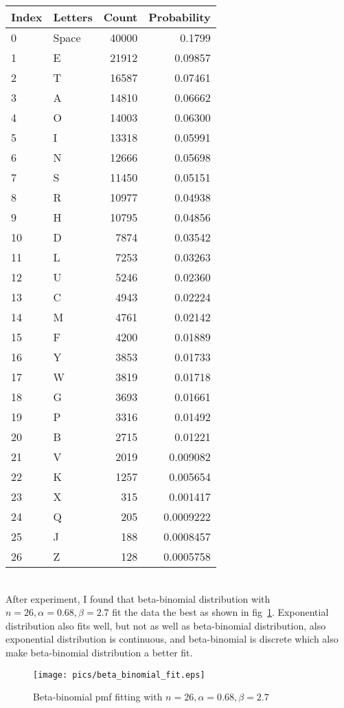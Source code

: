 \documentclass{assignment}
\begin{document}
\begin{enumerate}
\begin{enumerate}
    \begin{tabular}[h]{l|l|r|r}
      Index & Letters & Count & Probability\\
      \hline
      0     & Space   & 40000 & 0.1799\\
      1     & E       & 21912 & 0.09857\\
      2     & T       & 16587 & 0.07461\\
      3     & A       & 14810 & 0.06662\\
      4     & O       & 14003 & 0.06300\\
      5     & I       & 13318 & 0.05991\\
      6     & N       & 12666 & 0.05698\\
      7     & S       & 11450 & 0.05151\\
      8     & R       & 10977 & 0.04938\\
      9     & H       & 10795 & 0.04856\\
      10    & D       & 7874  & 0.03542\\
      11    & L       & 7253  & 0.03263\\
      12    & U       & 5246  & 0.02360\\
      13    & C       & 4943  & 0.02224\\
      14    & M       & 4761  & 0.02142\\
      15    & F       & 4200  & 0.01889\\
      16    & Y       & 3853  & 0.01733\\
      17    & W       & 3819  & 0.01718\\
      18    & G       & 3693  & 0.01661\\
      19    & P       & 3316  & 0.01492\\
      20    & B       & 2715  & 0.01221\\
      21    & V       & 2019  & 0.009082\\
      22    & K       & 1257  & 0.005654\\
      23    & X       & 315   & 0.001417\\
      24    & Q       & 205   & 0.0009222\\
      25    & J       & 188   & 0.0008457\\
      26    & Z       & 128   & 0.0005758
    \end{tabular} \\

    After experiment, I found that beta-binomial distribution with $n=26, \alpha=0.68, \beta=2.7$ fit the data the best
    as shown in fig~\ref{fig:beta-binomial-fit}. Exponential distribution also fits well, but not as well as
    beta-binomial distribution, also exponential distribution is continuous, and beta-binomial is discrete which also
    make beta-binomial distribution a better fit.
    \begin{figure}[!h]
      \centering
      \texttt{[image: pics/beta\_binomial\_fit.eps]}
      \caption{Beta-binomial pmf fitting with $n=26, \alpha=0.68, \beta=2.7$}
      \label{fig:beta-binomial-fit}
    \end{figure}


\end{enumerate}
\end{enumerate}
\end{document}
